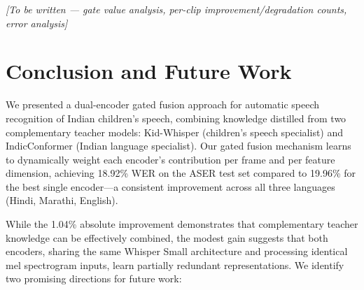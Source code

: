 \documentclass{article} %
\begin{document}
%
%
%
%
\textit{[To be written --- gate value analysis, per-clip improvement/degradation counts, error analysis]}

\section{Conclusion and Future Work}
\label{sec:conclusion}

We presented a dual-encoder gated fusion approach for automatic speech recognition of Indian children's speech, combining knowledge distilled from two complementary teacher models: Kid-Whisper (children's speech specialist) and IndicConformer (Indian language specialist). Our gated fusion mechanism learns to dynamically weight each encoder's contribution per frame and per feature dimension, achieving 18.92\% WER on the ASER test set compared to 19.96\% for the best single encoder---a consistent improvement across all three languages (Hindi, Marathi, English).

While the 1.04\% absolute improvement demonstrates that complementary teacher knowledge can be effectively combined, the modest gain suggests that both encoders, sharing the same Whisper Small architecture and processing identical mel spectrogram inputs, learn partially redundant representations. We identify two promising directions for future work:
\end{document}
